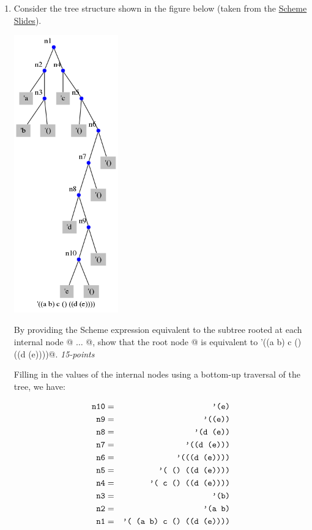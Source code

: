 \documentclass[12pt]{article}
\begin{document}
\begin{enumerate}
\item Consider the tree structure shown in the figure below (taken from the \href{http://zdu.binghamton.edu/cs571-16f/slides/scheme/scheme.pdf}{Scheme Slides}).

  \begin{center}
    \includegraphics[height=120mm]{nest2}\\
  \end{center}

  By providing the Scheme expression equivalent to the subtree rooted
  at each internal node @ $\ldots$ @, show that the
  root node @ is equivalent to \verb@'((a b) c () ((d (e))))@.
  \hfill{\textit{15-points}}

  Filling in the values of the internal nodes using a bottom-up
  traversal of the tree, we have:

  \begin{eqnarray*}
    \mbox{\texttt{n10}} & = & \mbox{\texttt{'(e)}} \\
    \mbox{\texttt{n9}} & = & \mbox{\texttt{'((e))}} \\
    \mbox{\texttt{n8}} & = & \mbox{\texttt{'(d (e))}} \\
    \mbox{\texttt{n7}} & = & \mbox{\texttt{'((d (e)))}} \\
    \mbox{\texttt{n6}} & = & \mbox{\texttt{'(((d (e))))}} \\
    \mbox{\texttt{n5}} & = & \mbox{\texttt{'( () ((d (e))))}} \\
    \mbox{\texttt{n4}} & = & \mbox{\texttt{'( c () ((d (e))))}} \\
    \mbox{\texttt{n3}} & = & \mbox{\texttt{'(b)}} \\
    \mbox{\texttt{n2}} & = & \mbox{\texttt{'(a b)}} \\
    \mbox{\texttt{n1}} & = & \mbox{\texttt{'( (a b) c () ((d (e))))}} 
  \end{eqnarray*}


\end{enumerate}
\end{document}
